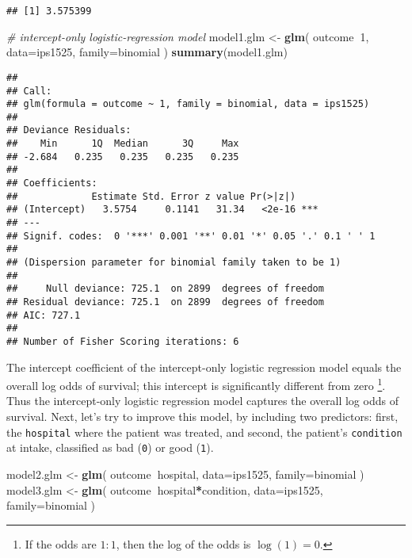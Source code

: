 \documentclass[]{book}
\newenvironment{Shaded}{\begin{snugshade}}{\end{snugshade}}
\newcommand{\CommentTok}[1]{\textcolor[rgb]{0.56,0.35,0.01}{\textit{#1}}}
\newcommand{\DataTypeTok}[1]{\textcolor[rgb]{0.13,0.29,0.53}{#1}}
\newcommand{\DecValTok}[1]{\textcolor[rgb]{0.00,0.00,0.81}{#1}}
\newcommand{\KeywordTok}[1]{\textcolor[rgb]{0.13,0.29,0.53}{\textbf{#1}}}
\newcommand{\NormalTok}[1]{#1}
\newcommand{\OperatorTok}[1]{\textcolor[rgb]{0.81,0.36,0.00}{\textbf{#1}}}
\newcommand{\StringTok}[1]{\textcolor[rgb]{0.31,0.60,0.02}{#1}}
\begin{document}
\begin{verbatim}
## [1] 3.575399
\end{verbatim}

\begin{Shaded}
\begin{Highlighting}[]
\CommentTok{# intercept-only logistic-regression model}
\NormalTok{model1.glm <-}\StringTok{ }\KeywordTok{glm}\NormalTok{( outcome}\OperatorTok{~}\DecValTok{1}\NormalTok{, }\DataTypeTok{data=}\NormalTok{ips1525, }\DataTypeTok{family=}\NormalTok{binomial )}
\KeywordTok{summary}\NormalTok{(model1.glm) }
\end{Highlighting}
\end{Shaded}

\begin{verbatim}
## 
## Call:
## glm(formula = outcome ~ 1, family = binomial, data = ips1525)
## 
## Deviance Residuals: 
##    Min      1Q  Median      3Q     Max  
## -2.684   0.235   0.235   0.235   0.235  
## 
## Coefficients:
##             Estimate Std. Error z value Pr(>|z|)    
## (Intercept)   3.5754     0.1141   31.34   <2e-16 ***
## ---
## Signif. codes:  0 '***' 0.001 '**' 0.01 '*' 0.05 '.' 0.1 ' ' 1
## 
## (Dispersion parameter for binomial family taken to be 1)
## 
##     Null deviance: 725.1  on 2899  degrees of freedom
## Residual deviance: 725.1  on 2899  degrees of freedom
## AIC: 727.1
## 
## Number of Fisher Scoring iterations: 6
\end{verbatim}

The intercept coefficient of the intercept-only logistic regression
model equals the overall log odds of survival; this intercept is
significantly different from zero \footnote{If the odds are \(1:1\), then the log of the odds is \(\log(1)=0\).}. Thus the intercept-only
logistic regression model captures the overall log odds of survival.
Next, let's try to improve this model, by including two predictors:
first, the \texttt{hospital} where the patient was treated, and second, the
patient's \texttt{condition} at intake, classified as bad
(\texttt{0}) or good (\texttt{1}).

\begin{Shaded}
\begin{Highlighting}[]
\NormalTok{model2.glm <-}\StringTok{ }\KeywordTok{glm}\NormalTok{( outcome}\OperatorTok{~}\NormalTok{hospital, }\DataTypeTok{data=}\NormalTok{ips1525, }\DataTypeTok{family=}\NormalTok{binomial ) }
\NormalTok{model3.glm <-}\StringTok{ }\KeywordTok{glm}\NormalTok{( outcome}\OperatorTok{~}\NormalTok{hospital}\OperatorTok{*}\NormalTok{condition, }
                   \DataTypeTok{data=}\NormalTok{ips1525, }\DataTypeTok{family=}\NormalTok{binomial ) }
\end{Highlighting}
\end{Shaded}
\end{document}
